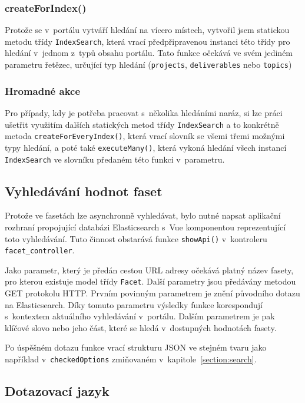 \subsubsection*{createForIndex()}
Protože se v~portálu vytváří hledání na vícero místech, vytvořil jsem statickou metodu třídy \texttt{IndexSearch}, která vrací předpřipravenou instanci této třídy pro hledání v~jednom z~typů obsahu portálu. Tato funkce očekává ve svém jediném parametru řetězec, určující typ hledání (\texttt{projects}, \texttt{deliverables} nebo \texttt{topics})

\subsubsection*{Hromadné akce}
Pro případy, kdy je potřeba pracovat s~několika hledáními naráz, si lze práci ušetřit využitím dalších statických metod třídy \texttt{IndexSearch} a to konkrétně metoda \texttt{createForEveryIndex()}, která vrací slovník se všemi třemi možnými typy hledání, a poté také \texttt{executeMany()}, která vykoná hledání všech instancí \texttt{IndexSearch} ve slovníku předaném této funkci v~parametru. 

\subsection{Vyhledávání hodnot faset}
Protože ve fasetách lze asynchronně vyhledávat, bylo nutné napsat aplikační rozhraní propojující databázi Elasticsearch s~Vue komponentou reprezentující toto vyhledávání. Tuto činnost obstarává funkce \texttt{showApi()} v~kontroleru \texttt{facet\_controller}.

Jako parametr, který je předán cestou URL adresy očekává platný název fasety, pro kterou existuje model třídy \texttt{Facet}. Další parametry jsou předávány metodou GET protokolu HTTP. Prvním povinným parametrem je znění původního dotazu na Elasticsearch. Díky tomuto parametru výsledky funkce korespondují s~kontextem aktuálního vyhledávání v~portálu. Dalším parametrem je pak klíčové slovo nebo jeho část, které se hledá v~dostupných hodnotách fasety. 

Po úspěšném dotazu funkce vrací strukturu JSON ve stejném tvaru jako například v~\texttt{checkedOptions} zmiňovaném v~kapitole~\ref{section:search}.

\subsection{Dotazovací jazyk}
\blindtext[2]

